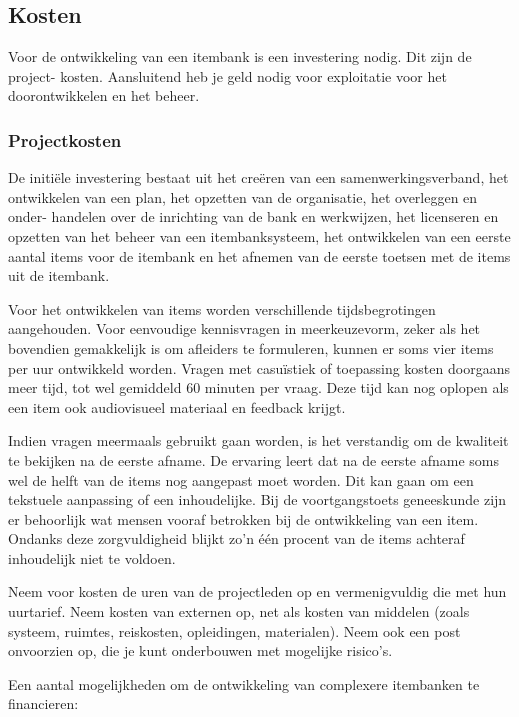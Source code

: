 \documentclass[
]{book}
\begin{document}
\hypertarget{kosten}{%
\subsection{Kosten}\label{kosten}}

Voor de ontwikkeling van een itembank is een investering nodig. Dit zijn de project- kosten. Aansluitend heb je geld nodig voor exploitatie voor het doorontwikkelen en het beheer.

\hypertarget{projectkosten}{%
\subsubsection{Projectkosten}\label{projectkosten}}

De initiële investering bestaat uit het creëren van een samenwerkingsverband, het ontwikkelen van een plan, het opzetten van de organisatie, het overleggen en onder- handelen over de inrichting van de bank en werkwijzen, het licenseren en opzetten van het beheer van een itembanksysteem, het ontwikkelen van een eerste aantal items voor de itembank en het afnemen van de eerste toetsen met de items uit de itembank.

Voor het ontwikkelen van items worden verschillende tijdsbegrotingen aangehouden. Voor eenvoudige kennisvragen in meerkeuzevorm, zeker als het bovendien gemakkelijk is om afleiders te formuleren, kunnen er soms vier items per uur ontwikkeld worden. Vragen met casuïstiek of toepassing kosten doorgaans meer tijd, tot wel gemiddeld 60 minuten per vraag. Deze tijd kan nog oplopen als een item ook audiovisueel materiaal en feedback krijgt.

Indien vragen meermaals gebruikt gaan worden, is het verstandig om de kwaliteit te bekijken na de eerste afname. De ervaring leert dat na de eerste afname soms wel de helft van de items nog aangepast moet worden. Dit kan gaan om een tekstuele aanpassing of een inhoudelijke. Bij de voortgangstoets geneeskunde zijn er behoorlijk wat mensen vooraf betrokken bij de ontwikkeling van een item. Ondanks deze zorgvuldigheid blijkt zo'n één procent van de items achteraf inhoudelijk niet te voldoen.

Neem voor kosten de uren van de projectleden op en vermenigvuldig die met hun uurtarief. Neem kosten van externen op, net als kosten van middelen (zoals systeem, ruimtes, reiskosten, opleidingen, materialen). Neem ook een post onvoorzien op, die je kunt onderbouwen met mogelijke risico's.

Een aantal mogelijkheden om de ontwikkeling van complexere itembanken te financieren:
\end{document}
